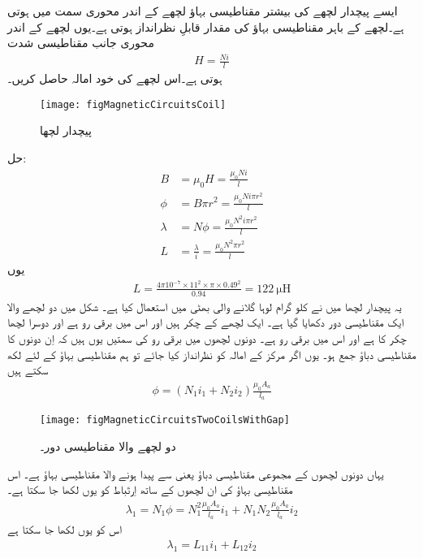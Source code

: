 ایسے پیچدار لچھے کی بیشتر مقناطیسی بہاؤ لچھے کے اندر محوری سمت میں ہوتی ہے۔لچھے کے باہر مقناطیسی بہاؤ کی مقدار قابلِ نظرانداز ہوتی ہے۔یوں لچھے کے اندر محوری جانب مقناطیسی شدت
\begin{align*}
H=\frac{N i}{l}
\end{align*}
ہوتی ہے۔اس لچھے کی خود امالہ حاصل کریں۔
\begin{figure}
\centering
\texttt{[image: figMagneticCircuitsCoil]}
\caption{پیچدار لچھا}
\label{شکل_مقناطیسی_ادوار_پیچدار_لچھا}
\end{figure}
حل:
\begin{align*}
B&=\mu_0 H=\frac{\mu_0 N i}{l}\\
\phi&=B  \pi r^2=\frac{\mu_0 N i \pi r^2}{l}\\ 
\lambda&=N \phi =\frac{\mu_0 N^2 i \pi r^2}{l}\\ 
L&=\frac{\lambda}{i}=\frac{\mu_0 N^2 \pi r^2}{l}
\end{align*} 
یوں
\begin{align*}
L=\frac{4 \pi 10^{-7} \times 11^2 \times \pi  \times 0.49^2}{0.94}=\SI{122}{\micro \henry}
\end{align*}
یہ پیچدار لچھا میں نے   کلو گرام لوہا گلانے والی بھٹی میں استعمال کیا ہے۔
%
شکل  میں دو لچھے والا ایک مقناطیسی دور دکھایا گیا ہے۔ ایک لچھے کے   چکر ہیں اور اس میں برقی رو  ہے اور دوسرا لچھا  چکر کا ہے اور اس میں برقی  رو  ہے۔ دونوں لچھوں میں برقی رو کی سمتیں یوں ہیں کہ اِن  دونوں کا مقناطیسی دباؤ جمع ہو۔ یوں اگر مرکز کے امالہ کو نظرانداز کیا جائے تو ہم مقناطیسی بہاؤ  کے لئے لکھ سکتے ہیں
\begin{align}
\phi=\left (N_1 i_1 +N_2 i_2 \right ) \frac{\mu_0 A_a}{l_a}
\end{align} 
%
\begin{figure}
\centering
\texttt{[image: figMagneticCircuitsTwoCoilsWithGap]}
\caption{دو لچھے والا مقناطیسی دور۔}
\label{شکل_مقناطیسی_ادوار_دو_لچھے_ایک_درز}
\end{figure}
یہاں  دونوں لچھوں کے مجموعی مقناطیسی دباؤ یعنی  سے پیدا ہونے والا مقناطیسی بہاؤ ہے۔ اس مقناطیسی بہاؤ  کی ان  لچھوں  کے ساتھ  اِرتَباط کو یوں لکھا جا سکتا ہے۔
\begin{align}
\lambda_1=N_1 \phi=N_1^2  \frac{\mu_0 A_a}{l_a} i_1 +N_1 N_2  \frac{\mu_0 A_a}{l_a} i_2
\end{align}
اس کو یوں لکھا جا سکتا ہے
\begin{align}
\lambda_1 = L_{11} i_1+L_{12} i_2
\end{align}
